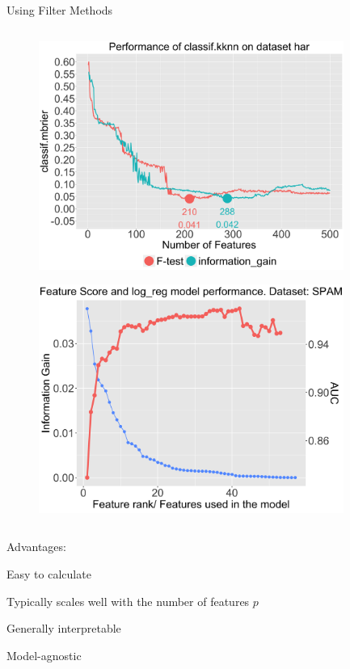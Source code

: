 \documentclass[11pt,compress,t,notes=noshow, xcolor=table]{beamer}
\begin{document}
\begin{vbframe}{Using Filter Methods}
\begin{columns}
   \begin{column}{0.46\textwidth}
      \begin{figure}
        \centering
        \includegraphics[width=0.89\textwidth]{figure/filter_comparison_har_classif.kknn.png}
      \end{figure}
      \vspace{-0.4cm}
      \begin{figure}
      \includegraphics[width=0.89\textwidth]{figure/fs-filters-scree-plot.png}
      \end{figure}
    \end{column}

  \end{columns}



  \framebreak

  \begin{blocki}{Advantages:}
  \setlength{\itemsep}{1.2em}
    \item Easy to calculate
    \item Typically scales well with the number of features $p$
    \item Generally interpretable
    \item Model-agnostic
  \end{blocki}


\end{vbframe}
\end{document}
